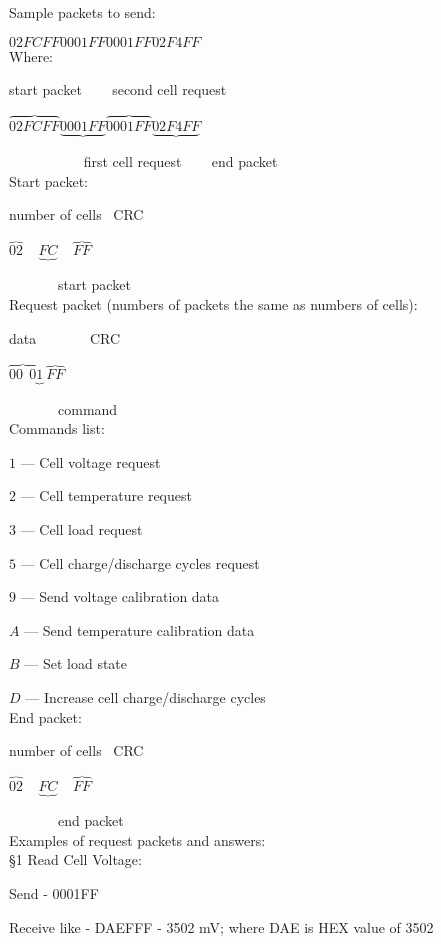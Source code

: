 \documentclass{article}
\begin{document}
Sample packets to send:

$02FCFF 0001FF 0001FF 02F4FF$\\

Where:

start packet ~~~ second cell request

$\overbrace{02FCFF} \underbrace{0001FF} \overbrace{0001FF} \underbrace{02F4FF}$

~~~~~~~~~~ first cell request ~~~ end packet\\

Start packet:

number of cells~ CRC

$\overbrace{02}~~~~~\underbrace{FC}~~~~~\overbrace{FF}$

~~~~~~~start packet\\

Request packet (numbers of packets the same as numbers of cells):

data~~~~~~~ CRC

$\overbrace{00~~0}\underbrace{1}~\overbrace{FF}$

~~~~~~~command\\

Commands list:

$1$ --- Cell voltage request

$2$ --- Cell temperature request

$3$ --- Cell load request

$5$ --- Cell charge/discharge cycles request

$9$ --- Send voltage calibration data

$A$ --- Send temperature calibration data

$B$ --- Set load state 

$D$ --- Increase cell charge/discharge cycles\\

End packet:

number of cells~ CRC

$\overbrace{02}~~~~~\underbrace{FC}~~~~~\overbrace{FF}$

~~~~~~~end packet\\


Examples of request packets and answers:\\

\S 1 Read Cell Voltage:

Send - 0001FF

Receive like - DAEFFF - 3502 mV; where DAE is HEX value of 3502\\
\end{document}
